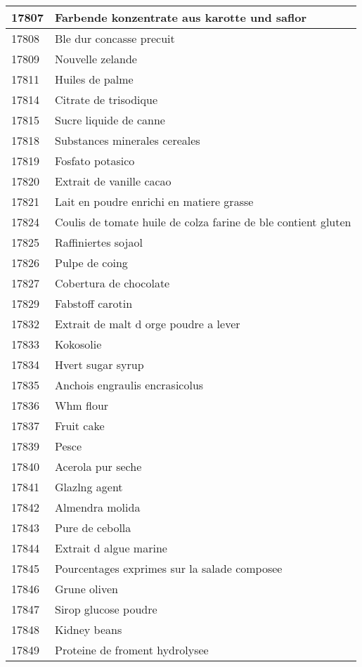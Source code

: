 \begin{longtable}{|l|l|}
17807 & Farbende konzentrate aus karotte und saflor \\ \hline 
17808 & Ble dur concasse precuit \\ \hline 
17809 & Nouvelle zelande \\ \hline 
17811 & Huiles de palme \\ \hline 
17814 & Citrate de trisodique \\ \hline 
17815 & Sucre liquide de canne \\ \hline 
17818 & Substances minerales cereales \\ \hline 
17819 & Fosfato potasico \\ \hline 
17820 & Extrait de vanille cacao \\ \hline 
17821 & Lait en poudre enrichi en matiere grasse \\ \hline 
17824 & Coulis de tomate huile de colza farine de ble contient gluten \\ \hline 
17825 & Raffiniertes sojaol \\ \hline 
17826 & Pulpe de coing \\ \hline 
17827 & Cobertura de chocolate \\ \hline 
17829 & Fabstoff carotin \\ \hline 
17832 & Extrait de malt d orge poudre a lever \\ \hline 
17833 & Kokosolie \\ \hline 
17834 & Hvert sugar syrup \\ \hline 
17835 & Anchois engraulis encrasicolus \\ \hline 
17836 & Whm flour \\ \hline 
17837 & Fruit cake \\ \hline 
17839 & Pesce \\ \hline 
17840 & Acerola pur seche \\ \hline 
17841 & Glazlng agent \\ \hline 
17842 & Almendra molida \\ \hline 
17843 & Pure de cebolla \\ \hline 
17844 & Extrait d algue marine \\ \hline 
17845 & Pourcentages exprimes sur la salade composee \\ \hline 
17846 & Grune oliven \\ \hline 
17847 & Sirop glucose poudre \\ \hline 
17848 & Kidney beans \\ \hline 
17849 & Proteine de froment hydrolysee \\ \hline 

\end{longtable}
